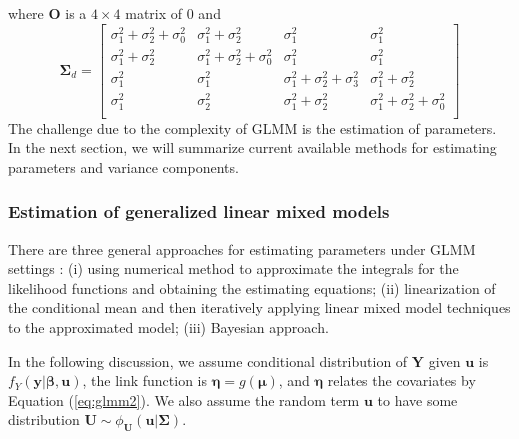 where $\bm O$ is a $4\times 4$ matrix of 0 and 
\[
\bm \Sigma_d = \left[
\begin{array}{cccc}
\sigma^2_1+ \sigma^2_2 + \sigma^2_0  & \sigma^2_1+\sigma^2_2 & \sigma^2_1 &\sigma^2_1\\
\sigma^2_1+\sigma^2_2 & \sigma^2_1 +\sigma^2_2 +\sigma^2_0 &\sigma^2_1 &\sigma^2_1\\
\sigma^2_1 & \sigma^2_1& \sigma^2_1+\sigma^2_2+\sigma^2_3 & \sigma^2_1 + \sigma^2_2\\
\sigma^2_1 &\sigma^2_2 &\sigma^2_1 +\sigma^2_2 & \sigma^2_1 +\sigma^2_2 +\sigma^2_0\\
\end{array}
\right]
\]
The challenge due to the complexity of GLMM is the estimation of parameters. In the next section,
we will summarize current available methods for estimating parameters and variance components.

\subsubsection{Estimation of generalized linear mixed models}\label{subsub:estimation}	
There are three general approaches for estimating parameters under GLMM settings \citep[Chapter
7]{myers2012generalized}: (i) using numerical method to approximate the integrals for the likelihood
functions and obtaining the estimating equations; (ii) linearization of the conditional mean and
then iteratively applying linear mixed model techniques to the approximated model; (iii) Bayesian
approach.  

In the following discussion, we assume conditional distribution of $\bm Y$ given $\bm u$ is
$f_{Y}(\bm y|\bm \beta, \bm u)$, the link function is $\bm \eta = g(\bm \mu)$, and $\bm \eta$
relates the covariates by Equation (\ref{eq:glmm2}). We also assume the random term $\bm u$ to have
some distribution $\bm U \sim \phi_{\bm U}(\bm u|\bm \Sigma)$. 	

